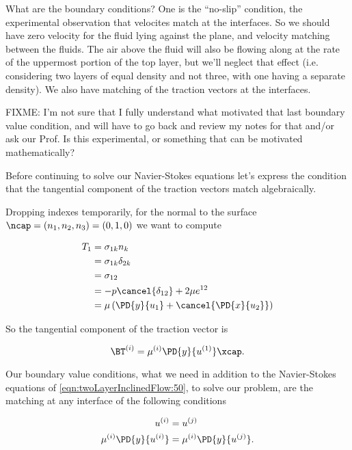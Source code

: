 What are the boundary conditions?  One is the ``no-slip'' condition, the experimental observation that velocites match at the interfaces.  So we should have zero velocity for the fluid lying against the plane, and velocity matching between the fluids.  The air above the fluid will also be flowing along at the rate of the uppermost portion of the top layer, but we'll neglect that effect (i.e. considering two layers of equal density and not three, with one having a separate density).  We also have matching of the traction vectors at the interfaces.  

FIXME: I'm not sure that I fully understand what motivated that last boundary value condition, and will have to go back and review my notes for that and/or ask our Prof.  Is this experimental, or something that can be motivated mathematically?

Before continuing to solve our Navier-Stokes equations let's express the condition that the tangential component of the traction vectors match algebraically.

Dropping indexes temporarily, for the normal to the surface $\ncap = (n_1, n_2, n_3) = (0, 1, 0)$ we want to compute

\begin{align*}
T_1 
&= \sigma_{1 k} n_k \\
&= \sigma_{1 k} \delta_{2 k} \\
&= \sigma_{1 2} \\
&= -p \cancel{\delta_{1 2}} + 2 \mu e^{1 2} \\
&= \mu \left( \PD{y}{u_1} + \cancel{\PD{x}{u_2}} \right) 
\end{align*}

So the tangential component of the traction vector is

\begin{equation}\label{eqn:twoLayerInclinedFlow:90}
\BT^{(i)} = \mu^{(i)} \PD{y}{u^{(1)}} \xcap.
\end{equation}

Our boundary value conditions, what we need in addition to the Navier-Stokes equations of \ref{eqn:twoLayerInclinedFlow:50}, to solve our problem, are the matching at any interface of the following conditions

\begin{align}\label{eqn:twoLayerInclinedFlow:70}
u^{(i)} &= u^{(j)} \\
\mu^{(i)} \PD{y}{u^{(i)}} &= \mu^{(i)} \PD{y}{u^{(j)}}.
\end{align}

